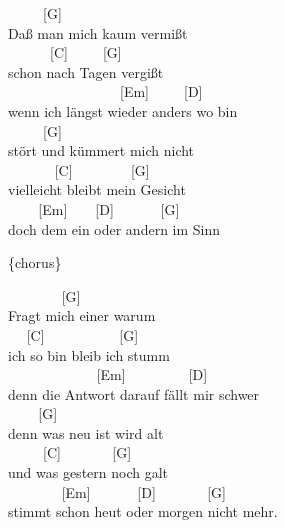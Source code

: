 \documentclass[
  letterpaper,
  twoside=false]{scrbook}
\begin{document}
~ ~ ~ {[}G{]} ~ ~ ~ ~ ~ ~ ~ ~\\
Daß man mich kaum vermißt\\
\hspace*{0.333em} ~ ~ ~ ~{[}C{]} ~ ~ ~{[}G{]}\\
schon nach Tagen vergißt\\
\hspace*{0.333em} ~ ~ ~ ~ ~ ~ ~ ~ ~ ~{[}Em{]} ~ ~ ~{[}D{]}\\
wenn ich längst wieder anders wo bin\\
\hspace*{0.333em} ~ ~ ~ {[}G{]} ~ ~ ~ ~ ~ ~ ~ ~\\
stört und kümmert mich nicht\\
\hspace*{0.333em} ~ ~ ~ ~ {[}C{]} ~ ~ ~ ~ ~{[}G{]}\\
vielleicht bleibt mein Gesicht\\
\hspace*{0.333em} ~ ~ ~{[}Em{]} ~ ~ {[}D{]} ~ ~ ~ ~{[}G{]}\\
doch dem ein oder andern im Sinn

\{chorus\}

~ ~ ~ ~ ~{[}G{]} ~ ~ ~ ~ ~\\
Fragt mich einer warum\\
\hspace*{0.333em} ~ ~{[}C{]} ~ ~ ~ ~ ~ ~ {[}G{]}\\
ich so bin bleib ich stumm\\
\hspace*{0.333em} ~ ~ ~ ~ ~ ~ ~ ~{[}Em{]} ~ ~ ~ ~ ~ {[}D{]}\\
denn die Antwort darauf fällt mir schwer\\
\hspace*{0.333em} ~ ~ ~{[}G{]} ~ ~ ~ ~ ~ ~ ~\\
denn was neu ist wird alt\\
\hspace*{0.333em} ~ ~ ~ {[}C{]} ~ ~ ~ ~ {[}G{]}\\
und was gestern noch galt\\
\hspace*{0.333em} ~ ~ ~ ~ ~{[}Em{]} ~ ~ ~ ~{[}D{]} ~ ~ ~ ~ {[}G{]}\\
stimmt schon heut oder morgen nicht mehr.
\end{document}
